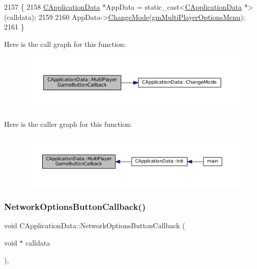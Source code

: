 \begin{DoxyCode}
2157                                                                   \{
2158     \hyperlink{classCApplicationData}{CApplicationData} *AppData = \textcolor{keyword}{static\_cast<}\hyperlink{classCApplicationData}{CApplicationData} *\textcolor{keyword}{>}(calldata);
2159     
2160     AppData->\hyperlink{classCApplicationData_aee18c113e9a0acb3cad3d63eb19de71b}{ChangeMode}(\hyperlink{classCApplicationData_ac8ac37a4c8bb871036fbbdc6a072e403a05987f29b3dd70c7223dd209c0f4ef8e}{gmMultiPlayerOptionsMenu});
2161 \}
\end{DoxyCode}
Here is the call graph for this function\+:\nopagebreak
\begin{figure}[H]
\begin{center}
\leavevmode
\includegraphics[width=350pt]{classCApplicationData_afabb120415cdadf67edca20c67e8c6fa_cgraph}
\end{center}
\end{figure}
Here is the caller graph for this function\+:\nopagebreak
\begin{figure}[H]
\begin{center}
\leavevmode
\includegraphics[width=350pt]{classCApplicationData_afabb120415cdadf67edca20c67e8c6fa_icgraph}
\end{center}
\end{figure}
\hypertarget{classCApplicationData_ad41dbc2f54ee638aa64a1d0c22b3fba9}{}\label{classCApplicationData_ad41dbc2f54ee638aa64a1d0c22b3fba9} 
\subsubsection{\texorpdfstring{Network\+Options\+Button\+Callback()}{NetworkOptionsButtonCallback()}}
{\footnotesize\ttfamily void C\+Application\+Data\+::\+Network\+Options\+Button\+Callback (\begin{DoxyParamCaption}\item[{void $\ast$}]{calldata }\end{DoxyParamCaption})\hspace{0.3cm}{\ttfamily [static]}, {\ttfamily [protected]}}



